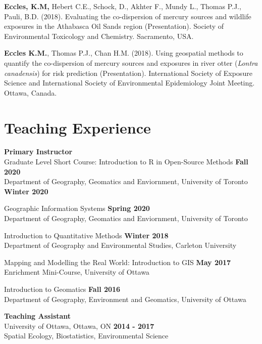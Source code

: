 \documentclass[margin,line]{res}
\begin{document}
\begin{resume}
\textbf{Eccles, K.M,} Hebert C.E., Schock, D., Akhter F., Mundy L., Thomas P.J., Pauli, B.D. (2018). Evaluating the co-dispersion of mercury sources and wildlife exposures in the Athabasca Oil Sands region (Presentation). Society of Environmental Toxicology and Chemistry. Sacramento, USA.

\textbf{Eccles K.M.}, Thomas P.J., Chan H.M. (2018). Using geospatial methods to quantify the co-dispersion of mercury sources and exposures in river otter (\textit{Lontra canadensis}) for risk prediction (Presentation). International Society of Exposure Science and International Society of Environmental Epidemiology Joint Meeting. Ottawa, Canada.


\vspace*{.1in}
\section{\sc Teaching Experience}
\textbf{Primary Instructor}\\
Graduate Level Short Course: Introduction to R in Open-Source Methods \hfill {\textbf{Fall 2020}}\\
Department of Geography, Geomatics and Enviornment, University of Toronto \hfill {\textbf{Winter 2020}}

Geographic Information Systems \hfill {\textbf{Spring 2020}}\\
Department of Geography, Geomatics and Enviornment, University of Toronto

Introduction to Quantitative Methods
 \hfill {\textbf{Winter 2018}}\\
Department of Geography and Environmental Studies, Carleton University

Mapping and Modelling the Real World: Introduction to GIS \hfill {\textbf{May 2017}}\\
Enrichment Mini-Course, University of Ottawa

Introduction to Geomatics
\hfill {\textbf{Fall 2016}}\\
Department of Geography, Environment and Geomatics, University of Ottawa

\textbf{Teaching Assistant }\\
University of Ottawa, Ottawa, ON
\hfill {\textbf{2014 - 2017}}\\
Spatial Ecology, Biostatistics, Environmental Science

\vspace*{.1in}


\end{resume}
\end{document}
